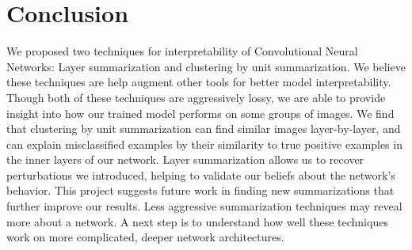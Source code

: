 \section{Conclusion}
\label{s:conclusion}


We proposed two techniques for interpretability of Convolutional Neural Networks: Layer summarization and clustering by unit summarization. We believe these techniques are help augment other tools for better model interpretability. Though both of these techniques are aggressively lossy, we are able to provide insight into how our trained model performs on some groups of images. We find that clustering by unit summarization can find similar images layer-by-layer, and can explain misclassified examples by their similarity to true positive examples in the inner layers of our network. Layer summarization allows us to recover perturbations we introduced, helping to validate our beliefs about the network's behavior. This project suggests future work in finding new summarizations that further improve our results. Less aggressive summarization techniques may reveal more about a network. A next step is to understand how well these techniques work on more complicated, deeper network architectures. 